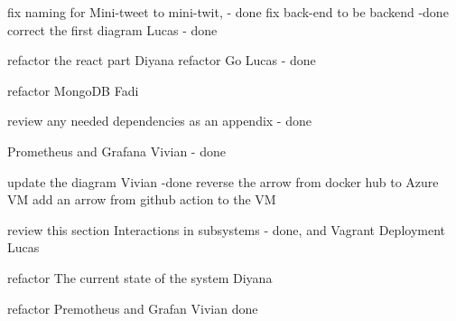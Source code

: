 fix naming for Mini-tweet to mini-twit, - done
fix back-end  to be backend -done
correct the first diagram Lucas - done

refactor the react part Diyana
refactor Go Lucas - done

refactor MongoDB Fadi

review any needed dependencies as an appendix - done


Prometheus and Grafana Vivian - done


update the diagram Vivian  -done
 reverse the arrow from docker hub to Azure VM
 add an arrow from github action to the VM
 
 
 review this section Interactions in subsystems - done, and Vagrant Deployment Lucas 
 
 refactor The current state of the system Diyana
 
 
 refactor Premotheus and Grafan Vivian done
 
 
